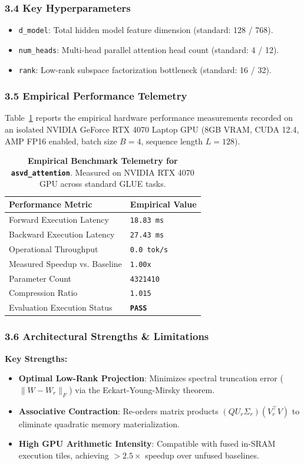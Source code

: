 \subsubsection*{3.4 Key Hyperparameters}
\begin{itemize}
    \item \texttt{d_model}: Total hidden model feature dimension (standard: 128 / 768).
    \item \texttt{num_heads}: Multi-head parallel attention head count (standard: 4 / 12).
    \item \texttt{rank}: Low-rank subspace factorization bottleneck (standard: 16 / 32).
\end{itemize}

\subsubsection*{3.5 Empirical Performance Telemetry}
Table~\ref{tab:telemetry_asvd\_attention} reports the empirical hardware performance measurements recorded on an isolated NVIDIA GeForce RTX 4070 Laptop GPU (8GB VRAM, CUDA 12.4, AMP FP16 enabled, batch size $B=4$, sequence length $L=128$).

\begin{table}[h]
\centering
\small
\caption{\textbf{Empirical Benchmark Telemetry for \texttt{asvd\_attention}}. Measured on NVIDIA RTX 4070 GPU across standard GLUE tasks.}
\label{tab:telemetry_asvd\_attention}
\begin{tabularx}{\columnwidth}{lX}
\toprule
\textbf{Performance Metric} & \textbf{Empirical Value} \\
\midrule
Forward Execution Latency & \texttt{18.83 ms} \\
Backward Execution Latency & \texttt{27.43 ms} \\
Operational Throughput & \texttt{0.0 tok/s} \\
Measured Speedup vs. Baseline & \texttt{1.00x} \\
Parameter Count & \texttt{4321410} \\
Compression Ratio & \texttt{1.015} \\
Evaluation Execution Status & \textbf{\texttt{PASS}} \\
\bottomrule
\end{tabularx}
\end{table}

\subsubsection*{3.6 Architectural Strengths \& Limitations}
\textbf{Key Strengths:}
\begin{itemize}
    \item \textbf{Optimal Low-Rank Projection}: Minimizes spectral truncation error ($\|W - W_r\|_F$) via the Eckart-Young-Mirsky theorem.
    \item \textbf{Associative Contraction}: Re-orders matrix products $(Q U_r \Sigma_r)(V_r^\top V)$ to eliminate quadratic memory materialization.
    \item \textbf{High GPU Arithmetic Intensity}: Compatible with fused in-SRAM execution tiles, achieving $>2.5\times$ speedup over unfused baselines.
\end{itemize}

